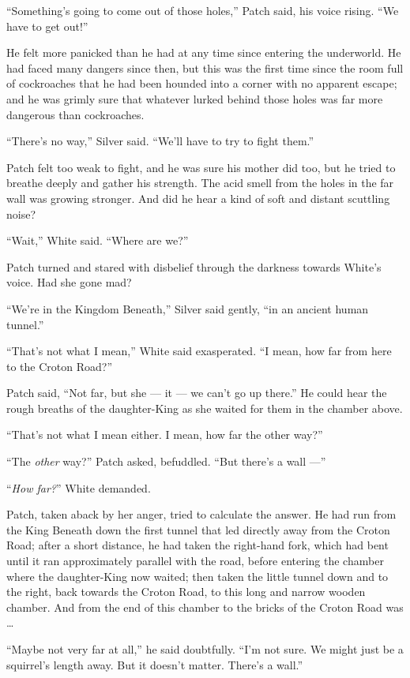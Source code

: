 \documentclass[12pt]{memoir}
\begin{document}
“Something’s going to come out of those holes,” Patch said, his voice
rising. “We have to get out!”

He felt more panicked than he had at any time since entering the
underworld. He had faced many dangers since then, but this was the
first time since the room full of cockroaches that he had been hounded
into a corner with no apparent escape; and he was grimly sure that
whatever lurked behind those holes was far more dangerous than
cockroaches.

“There’s no way,” Silver said. “We’ll have to try to fight them.”

Patch felt too weak to fight, and he was sure his mother did too, but
he tried to breathe deeply and gather his strength. The acid smell
from the holes in the far wall was growing stronger. And did he hear a
kind of soft and distant scuttling noise?

“Wait,” White said. “Where are we?”

Patch turned and stared with disbelief through the darkness towards
White’s voice. Had she gone mad?

“We’re in the Kingdom Beneath,” Silver said gently, “in an ancient
human tunnel.”

“That’s not what I mean,” White said exasperated. “I mean, how far
from here to the Croton Road?”

Patch said, “Not far, but she — it — we can’t go up there.” He could
hear the rough breaths of the daughter-King as she waited for them in
the chamber above.

“That’s not what I mean either. I mean, how far the other way?”

“The \textit{other} way?” Patch asked, befuddled. “But there’s a wall
—”

“\textit{How far?}” White demanded.

Patch, taken aback by her anger, tried to calculate the answer. He had
run from the King Beneath down the first tunnel that led directly away
from the Croton Road; after a short distance, he had taken the
right-hand fork, which had bent until it ran approximately parallel
with the road, before entering the chamber where the daughter-King now
waited; then taken the little tunnel down and to the right, back
towards the Croton Road, to this long and narrow wooden chamber. And
from the end of this chamber to the bricks of the Croton Road was …

“Maybe not very far at all,” he said doubtfully. “I’m not sure. We
might just be a squirrel’s length away. But it doesn’t matter. There’s
a wall.”
\end{document}
